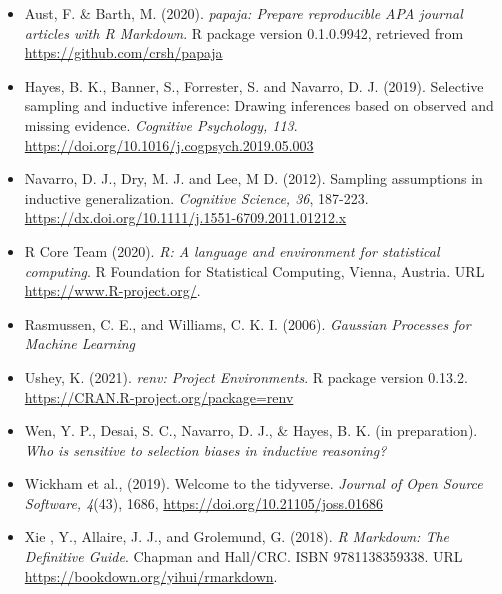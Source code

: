 \documentclass[
  english,
  doc]{apa6}
\providecommand{\tightlist}{%
  \setlength{\itemsep}{0pt}\setlength{\parskip}{0pt}}
\begin{document}
\begin{itemize}
\tightlist
\item
  Aust, F. \& Barth, M. (2020). \emph{papaja: Prepare reproducible APA journal
  articles with R Markdown}. R package version 0.1.0.9942, retrieved from
  \url{https://github.com/crsh/papaja}
\item
  Hayes, B. K., Banner, S., Forrester, S. and Navarro, D. J. (2019). Selective sampling and inductive inference: Drawing inferences based on observed and missing evidence. \emph{Cognitive Psychology, 113}. \url{https://doi.org/10.1016/j.cogpsych.2019.05.003}
\item
  Navarro, D. J., Dry, M. J. and Lee, M D. (2012). Sampling assumptions in inductive generalization. \emph{Cognitive Science, 36}, 187-223. \url{https://dx.doi.org/10.1111/j.1551-6709.2011.01212.x}
\item
  R Core Team (2020). \emph{R: A language and environment for statistical computing}. R Foundation for Statistical Computing, Vienna, Austria. URL
  \url{https://www.R-project.org/}.
\item
  Rasmussen, C. E., and Williams, C. K. I. (2006). \emph{Gaussian Processes for Machine Learning}
\item
  Ushey, K. (2021). \emph{renv: Project Environments}. R package version 0.13.2.
  \url{https://CRAN.R-project.org/package=renv}
\item
  Wen, Y. P., Desai, S. C., Navarro, D. J., \& Hayes, B. K. (in preparation). \emph{Who is sensitive to selection biases in inductive reasoning?}
\item
  Wickham et al., (2019). Welcome to the tidyverse. \emph{Journal of Open Source Software, 4}(43), 1686, \url{https://doi.org/10.21105/joss.01686}
\item
  Xie , Y., Allaire, J. J., and Grolemund, G. (2018). \emph{R Markdown: The Definitive Guide}. Chapman and Hall/CRC. ISBN 9781138359338. URL \url{https://bookdown.org/yihui/rmarkdown}.
\end{itemize}
\end{document}
